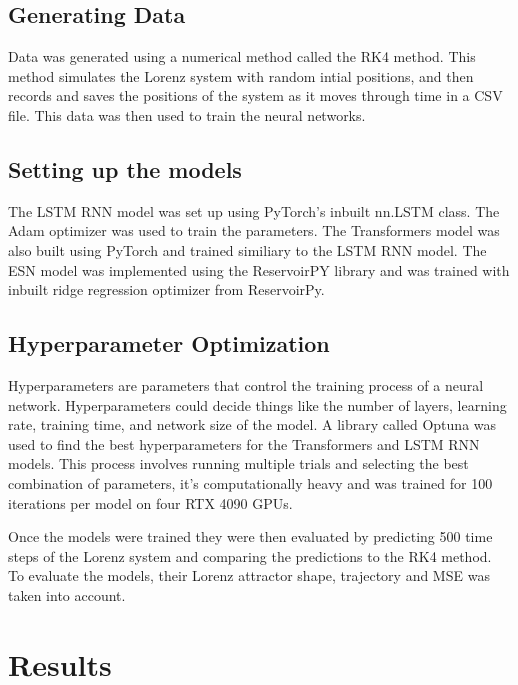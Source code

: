\documentclass[11pt]{article}
\begin{document}
\subsection{Generating Data}

Data was generated using a numerical method called the RK4 method. This method simulates the Lorenz system with random intial positions, and then records and saves the positions of the system as it moves through time in a CSV file. This data was then used to train the neural networks.

\subsection{Setting up the models}
The LSTM RNN model was set up using PyTorch's inbuilt nn.LSTM class. The Adam optimizer was used to train the parameters. The Transformers model was also built using PyTorch and trained similiary to the LSTM RNN model. The ESN model was implemented using the ReservoirPY library and was trained with inbuilt ridge regression optimizer from ReservoirPy.

\subsection{Hyperparameter Optimization}
Hyperparameters are parameters that control the training process of a neural network. Hyperparameters could decide things like the number of layers, learning rate, training time, and network size of the model. A library called Optuna was used to find the best hyperparameters for the Transformers and LSTM RNN models. This process involves running multiple trials and selecting the best combination of parameters, it's computationally heavy and was trained for 100 iterations per model on four RTX 4090 GPUs.

Once the models were trained they were then evaluated by predicting 500 time steps of the Lorenz system and comparing the predictions to the RK4 method. To evaluate the models, their Lorenz attractor shape, trajectory and MSE
was taken into account.

\section{Results}
\end{document}

